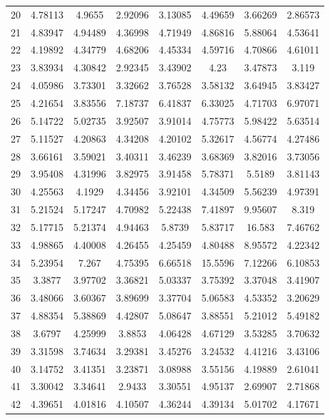 \begin{figure}
\begin{tabular}{cccccccc}
20 & 4.78113 & 4.9655 & 2.92096 & 3.13085 & 4.49659 & 3.66269 & 2.86573\\
21 & 4.83947 & 4.94489 & 4.36998 & 4.71949 & 4.86816 & 5.88064 & 4.53641\\
22 & 4.19892 & 4.34779 & 4.68206 & 4.45334 & 4.59716 & 4.70866 & 4.61011\\
23 & 3.83934 & 4.30842 & 2.92345 & 3.43902 & 4.23 & 3.47873 & 3.119\\
24 & 4.05986 & 3.73301 & 3.32662 & 3.76528 & 3.58132 & 3.64945 & 3.83427\\
25 & 4.21654 & 3.83556 & 7.18737 & 6.41837 & 6.33025 & 4.71703 & 6.97071\\
26 & 5.14722 & 5.02735 & 3.92507 & 3.91014 & 4.75773 & 5.98422 & 5.63514\\
27 & 5.11527 & 4.20863 & 4.34208 & 4.20102 & 5.32617 & 4.56774 & 4.27486\\
28 & 3.66161 & 3.59021 & 3.40311 & 3.46239 & 3.68369 & 3.82016 & 3.73056\\
29 & 3.95408 & 4.31996 & 3.82975 & 3.91458 & 5.78371 & 5.5189 & 3.81143\\
30 & 4.25563 & 4.1929 & 4.34456 & 3.92101 & 4.34509 & 5.56239 & 4.97391\\
31 & 5.21524 & 5.17247 & 4.70982 & 5.22438 & 7.41897 & 9.95607 & 8.319\\
32 & 5.17715 & 5.21374 & 4.94463 & 5.8739 & 5.83717 & 16.583 & 7.46762\\
33 & 4.98865 & 4.40008 & 4.26455 & 4.25459 & 4.80488 & 8.95572 & 4.22342\\
34 & 5.23954 & 7.267 & 4.75395 & 6.66518 & 15.5596 & 7.12266 & 6.10853\\
35 & 3.3877 & 3.97702 & 3.36821 & 5.03337 & 3.75392 & 3.37048 & 3.41907\\
36 & 3.48066 & 3.60367 & 3.89699 & 3.37704 & 5.06583 & 4.53352 & 3.20629\\
37 & 4.88354 & 5.38869 & 4.42807 & 5.08647 & 3.88551 & 5.21012 & 5.49182\\
38 & 3.6797 & 4.25999 & 3.8853 & 4.06428 & 4.67129 & 3.53285 & 3.70632\\
39 & 3.31598 & 3.74634 & 3.29381 & 3.45276 & 3.24532 & 4.41216 & 3.43106\\
40 & 3.14752 & 3.41351 & 3.23871 & 3.08988 & 3.55156 & 4.19889 & 2.61041\\
41 & 3.30042 & 3.34641 & 2.9433 & 3.30551 & 4.95137 & 2.69907 & 2.71868\\
42 & 4.39651 & 4.01816 & 4.10507 & 4.36244 & 4.39134 & 5.01702 & 4.17671\\

\end{tabular}
\end{figure}
